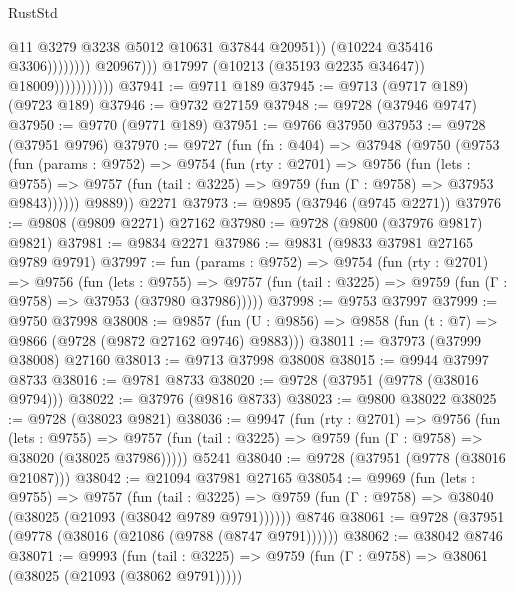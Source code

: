\begin{lexlean}{RustStd}
\begin{coremodule}
                                                  @11
                                                  @3279
                                                  @3238
                                                  @5012
                                                  @10631
                                                  @37844
                                                  @20951))
                                              (@10224 @35416 @3306))))))))
                                @20967)))
                          @17997
                          (@10213 (@35193 @2235 @34647))
                          @18009)))))))))))
@37941 := @9711 @189
@37945 := @9713 (@9717 @189) (@9723 @189)
@37946 := @9732 @27159
@37948 := @9728 (@37946 @9747)
@37950 := @9770 (@9771 @189)
@37951 := @9766 @37950
@37953 := @9728 (@37951 @9796)
@37970 := @9727
    (fun (fn : @404) =>
    @37948
      (@9750
        (@9753
          (fun (params : @9752) =>
          @9754
            (fun (rty : @2701) =>
            @9756
              (fun (lets : @9755) =>
              @9757 (fun (tail : @3225) => @9759 (fun (Γ : @9758) => @37953 @9843))))))
        @9889))
    @2271
@37973 := @9895 (@37946 (@9745 @2271))
@37976 := @9808 (@9809 @2271) @27162
@37980 := @9728 (@9800 (@37976 @9817) @9821)
@37981 := @9834 @2271
@37986 := @9831 (@9833 @37981 @27165 @9789 @9791)
@37997 := fun (params : @9752) =>
  @9754
    (fun (rty : @2701) =>
    @9756
      (fun (lets : @9755) =>
      @9757 (fun (tail : @3225) => @9759 (fun (Γ : @9758) => @37953 (@37980 @37986)))))
@37998 := @9753 @37997
@37999 := @9750 @37998
@38008 := @9857
    (fun (U : @9856) => @9858 (fun (t : @7) => @9866 (@9728 (@9872 @27162 @9746) @9883)))
@38011 := @37973 (@37999 @38008) @27160
@38013 := @9713 @37998 @38008
@38015 := @9944 @37997 @8733
@38016 := @9781 @8733
@38020 := @9728 (@37951 (@9778 (@38016 @9794)))
@38022 := @37976 (@9816 @8733)
@38023 := @9800 @38022
@38025 := @9728 (@38023 @9821)
@38036 := @9947
    (fun (rty : @2701) =>
    @9756
      (fun (lets : @9755) =>
      @9757 (fun (tail : @3225) => @9759 (fun (Γ : @9758) => @38020 (@38025 @37986)))))
    @5241
@38040 := @9728 (@37951 (@9778 (@38016 @21087)))
@38042 := @21094 @37981 @27165
@38054 := @9969
    (fun (lets : @9755) =>
    @9757
      (fun (tail : @3225) =>
      @9759 (fun (Γ : @9758) => @38040 (@38025 (@21093 (@38042 @9789 @9791))))))
    @8746
@38061 := @9728 (@37951 (@9778 (@38016 (@21086 (@9788 (@8747 @9791))))))
@38062 := @38042 @8746
@38071 := @9993
    (fun (tail : @3225) => @9759 (fun (Γ : @9758) => @38061 (@38025 (@21093 (@38062 @9791)))))

\end{coremodule}
\end{lexlean}
